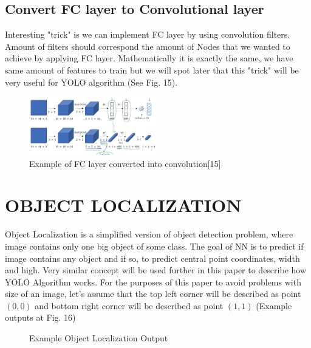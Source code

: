 \documentclass[letterpaper, 10 pt, conference]{ieeeconf}  %
\begin{document}
\subsection{Convert FC layer to Convolutional layer}
Interesting "trick" is we can implement FC layer by using convolution filters. Amount of filters should correspond the amount of Nodes that we wanted to achieve by applying FC layer.  Mathematically it is exactly the same, we have same amount of features to train but we will spot later that this "trick" will be very useful for YOLO algorithm (See Fig. 15). 

\begin{figure}[!ht]
	\centering
    \includegraphics[width=0.5\textwidth]{Pictures/FC_to_conv.png}
	\caption{Example of FC layer converted into convolution[15]}
\end{figure}

\section{OBJECT LOCALIZATION}

Object Localization is a simplified version of object detection problem, where image contains only one big object of some class. The goal of NN is to predict if image contains any object and if so, to predict central point coordinates, width and high. Very similar concept will be used further in this paper to describe how YOLO Algorithm works. For the purposes of this paper to avoid problems with size of an image, let's assume that the top left corner will be described as point $(0,0)$ and bottom right corner  will be described as point $(1,1)$ (Example outputs at Fig. 16)

\begin{figure}[!ht]
	\centering

	\caption{Example Object Localization Output}
\end{figure}
\end{document}
